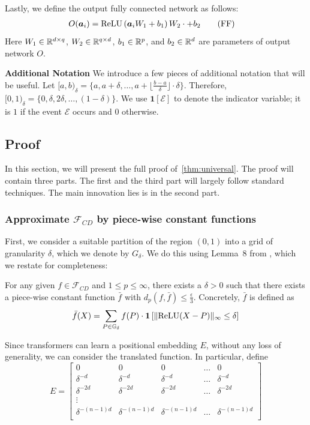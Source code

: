 Lastly, we define the output fully connected network as follows:
\begin{align*}
    O({\bm{a}}_i) &= \operatorname{ReLU} \left({\bm{a}}_i W_1 + b_1 \right)  W_2\cdot 
                    + b_2 \label{FF} \tag{FF}
\end{align*}
Here $W_1 \in \mathbb{R}^{ d\times q }$, $W_2 \in \mathbb{R}^{q \times d}$, $b_1\in\mathbb{R}^p$, and $b_2\in\mathbb{R}^d$ are parameters of 
output network $O$. 

\textbf{Additional Notation} We introduce a few pieces of additional notation that will be useful. 
Let $[a,b)_{\delta} = \{ a, a+\delta, \dots, a + \lfloor \frac{b-a}{\delta} \rfloor \cdot \delta \} $. Therefore,
$[0,1)_{\delta} = \{ 0, \delta, 2\delta, \dots, (1-\delta)\}$. 
We use $\mathbf{1} [ \mathcal{E}]$ to denote the indicator variable; it is $1$ if the event $\mathcal{E}$ occurs and $0$ otherwise. 

\subsection{Proof}
In this section, we will present the full proof of~\cref{thm:universal}. 
The proof will contain three parts. 
The first and the third part will largely follow standard techniques. The main innovation lies is in the second part. 


\subsubsection{Approximate \texorpdfstring{$\mathcal{F}_{CD}$}{Fcd} by piece-wise constant functions}
    First, we consider a suitable partition of the region $(0,1)$ into a 
    grid of granularity $\delta$, which we denote by $G_\delta$.  We do this using Lemma~8 from \citet{Yun19}, which we restate for completeness:
    \begin{lemma} \label{lem:piecewise}
       For any given $f \in \mathcal{F}_{CD}$ and $1\leq p \leq \infty$, there exists a $\delta >0$ such that
        there exists a piece-wise constant function $\bar{f}$ with $d_{p}(f,\bar{f}) \leq \frac{\epsilon}{3}$. 
         Concretely, $\bar{f}$ is defined as 
    \[ \bar{f}(X) = \sum_{P \in \mathbb{G}_{\delta}} f(P) \cdot \mathbf{1} \left[ \lVert\operatorname{ReLU}(X-P)\rVert_{\infty} \leq  \delta  \right]  \] 
    \end{lemma}

    Since transformers can learn a positional embedding $E$, without any loss of generality, 
    we can consider the translated function. In particular, define
    \[ E = \begin{bmatrix}
    0 & 0 & 0 & \dots & 0  \\
    \delta^{-d} & \delta^{-d} & \delta^{-d} & \dots & \delta^{-d}  \\
    \delta^{-2d} & \delta^{-2d} & \delta^{-2d} & \dots & \delta^{-2d}  \\
    \vdots \\
    \delta^{-(n-1)d}  & \delta^{-(n-1)d}  & \delta^{-(n-1)d}  & \dots & \delta^{-(n-1)d}  \\
    \end{bmatrix} \] 
    

